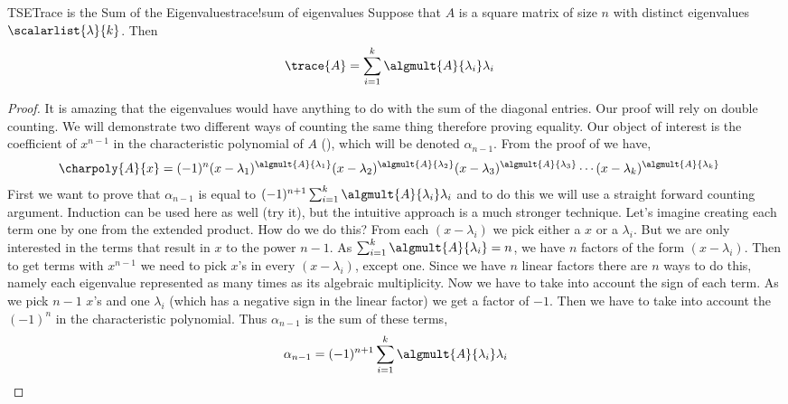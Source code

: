 %
\begin{theorem}{TSE}{Trace is the Sum of the Eigenvalues}{trace!sum of eigenvalues}
Suppose that $A$ is a square matrix of size $n$ with distinct eigenvalues $\scalarlist{\lambda}{k}$.  Then
%
\begin{align*}
\trace{A}
&=\sum_{i=1}^{k}\algmult{A}{\lambda_i}\lambda_i
\end{align*}
%
\end{theorem}
%
\begin{proof}
It is amazing that the eigenvalues would have anything to do with the sum of the diagonal entries.  Our proof will rely on double counting.  We will demonstrate two different ways of counting the same thing therefore proving equality.  Our object of interest is the coefficient of $x^{n-1}$ in the characteristic polynomial of $A$ (), which will be denoted $\alpha_{n-1}$.  From the proof of  we have,
%
\begin{align*}
\charpoly{A}{x}
&=(-1)^{n}
(x-\lambda_1)^{\algmult{A}{\lambda_1}}
(x-\lambda_2)^{\algmult{A}{\lambda_2}}
(x-\lambda_3)^{\algmult{A}{\lambda_3}}
\cdots
(x-\lambda_k)^{\algmult{A}{\lambda_k}}
\end{align*}
%
First we want to prove that $\alpha_{n-1}$ is equal to $(-1)^{n+1}\sum_{i=1}^{k}\algmult{A}{\lambda_i}\lambda_i$ and to do this we will use a straight forward counting argument. Induction can be used here as well (try it), but the intuitive approach is a much stronger technique. Let's imagine creating each term one by one from the extended product.  How do we do this? From each $(x-\lambda_i)$ we pick either a $x$ or a $\lambda_i$.  But we are only interested in the terms that result in $x$ to the power $n-1$.  As $\sum_{i=1}^k \algmult{A}{\lambda_i}=n$, we have $n$ factors of the form $(x-\lambda_i)$. Then to get terms with $x^{n-1}$ we need to pick $x$'s in every  $(x-\lambda_i)$, except one. Since we have $n$ linear factors there are $n$ ways to do this, namely each eigenvalue represented as many times as its algebraic multiplicity.  Now we have to take into account the sign of each term. As we pick $n-1$ $x$'s and one $\lambda_i$ (which has a negative sign in the linear factor) we get a factor of $-1$.  Then we have to take into account the $(-1)^{n}$ in the characteristic polynomial. Thus $\alpha_{n-1}$ is the sum of these terms,
%
\begin{align*}
\alpha_{n-1}=(-1)^{n+1}\sum_{i=1}^{k}\algmult{A}{\lambda_i}\lambda_i
\end{align*}

\end{proof}
